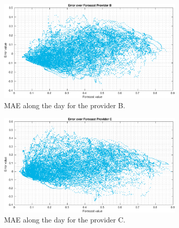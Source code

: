 \documentclass[aoas,preprint]{imsart}
\begin{document}
\begin{figure}[H]
\centering
\includegraphics[width=0.8\textwidth]{plots/scatter/prov_B/scatter.eps}
\caption{MAE along the day for the provider B.}
\label{sB}
\end{figure}

\begin{figure}[H]
\centering
\includegraphics[width=0.8\textwidth]{plots/scatter/prov_C/scatter.eps}
\caption{MAE along the day for the provider C.}
\label{sC}
\end{figure}

%
%
\end{document}
